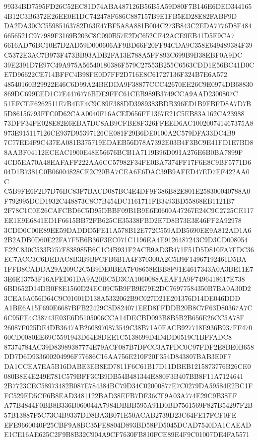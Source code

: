 \documentclass[UTF8,fontset=fandol,zihao=-4,a4paper]{ctexart}
\begin{document}
{{99334BD7595FD26C52EC81D74ABA487126B56B5A59D80F7B146E6DED3441654B12C3B6372E26EE0E1DC742478F686C887157B9E1FB5ED28E82FABF9D
DA2DA30CC55985163782D63E47BF5A8A881B004C273B843C2EDA7776D8F4846656521C977989F3169B203C8C090B57E2DC652CF42ACE9EB41D5E9CA7
6616AD76BC10E7D2AD59D000606AF9BD66F20FF94CDA9C358E649489384F39C5372E3AC7B973F473BB93ADB2FA13E788A5FF893C699B9B38EBF0A9DC
39E2391D7E97C49A975A56540180386F579C27553B255C6563CDD1E56BC41D0CE7D96622CE714BFFC4B98FE0D7FF2D716E8C61727136F324B7E6A572
48540160B29922E46C6D99A24BEDDA9F38877CCC42670EE26C9E0974DB68830869DC699EED1C7E4476776BDE9FFC61CEB989B3749CCA9AAD2300807C
51EFCEF6262511E7B4EE4C9C89F388DD3989383BDB396ED1B9FBFD8A7D7B5D86156793FFC0D62CAA0040F16ACED656FF1367E21C5EB83A162CA23988
73DFF34FE028E82E6EBA7DC8AB9CFBE8F326FFEED6AC100200741467375A8973E915117126CE937D95397126CE081F29B6DE0100A2C579DFA33DC4B9
7C77EE4F9C437EA081B375719EDAEB56D78A7392E03B4F3BC9E41FD1E7BD88AABF04112ECEAC1900E48E56676BCB1A7119B96D091A276E6B0BA7899F
4CD5EA70A48EAFAFF222AA6CC57982F34FE0BA7374FF17F6E8C9BF5771D604D1B7381C0B06004828CE2C20BA7CEA6E6DAC39B9AFED47ED7EF422AA0C
C5B9FE6F2D7D76BC83F7BACD087BC4E4DF9F386B82E801E258300040788A0F792995DCD1932C448873C8C7B454DC1161711FB3493BD55868EB1121B7
2F78C1C0E26CAFCBD6C5D95DBBF09B1B9E6E0600A47267E24C9C2725CE117EE1E9E6841ED1F6615BB72FB625CE35338FBD2E7D8B73E3E46FF2A92978
3CDD0C00E89EE59DADDD5FE11A578B12E772C559ADB5690EE9A812AD1A62B2ADB0D60E22FA7F5B6B36F3EC071C1196EA4E9126487243C9D3CD008054
E22C830C533B757F838985B6C1C4B931F2ACB9AD3B471F51D5D810FA7FDC36EC7ACC3C6DEDAC8B3B9BFCFB6B1A4F370300A2C5B9F14967192461D5BA
1FFB8CADDA29A209C2C5B9DE0BEA7F08658EBB8F91E4617343A0A3BE11E73E6E13753F16AFED61DA9A20BC5D3CA1060088AEAF1A9F7496418617E738
6BD652D14DB0F8E1560D24EC09C5B9FB9E79E2DC76977584350B7BA0A30D23CEA6A056D64C9C01001D138A5332062B9C027D21E201376D14DE046DDD
A1BE6A15F690E6687BFB22429C8D824071EED8FFDDB20B8C7F63D80367A7C6C95FE4C38743E03E6D5105006CCA14DECBD093B8B5B2B656E26CC5A78F
26087F025DE4DB3647AB2608970873549C38B71A0EACB927718E936B937FF47060CD0080EE69C5591943D64E8DEE1C5138699D4D4DD0519C1BFFADC8
87374784AC39D83989387774E79ACF087B7DFCC3A7FDC0C97FDF2E8BE0B658DD7D6D933600204996F77686C16AA756E210F20F354D843807BAB3E0F7
DA1CCEA7EA5B16DABE3EB8ED7811F6C61B17D11DBEB1215873776B26CE0080B8E4E249E781C579BFF3CB9DB54B481344E880F3B407BB8F11A7124641
2B7723CEC58973482B087E784384BC79D34C02000877E7C0279DA59584E2BC1FFC529ED5CF6B8EAD3481122BAD38EFB7DF36CF9A03A774E29C9B38EF
A77B4844F0BB8B336B060044A7984DBBB595A91D0BD7561569F827B54297F2B57B13887F5C73C4B9337DD8BA3B071E50ACAB2739D23C64FE17FCF0FE
EFE9660040F25CBF9A8BC35FE8804D893BD58FD5045DCAD7540DA1CAEADE1CE16AE625C2F9B8B32C904A9CF7630FB810FCE89E4F9C01007DE4FA5571
}}
\end{document}
